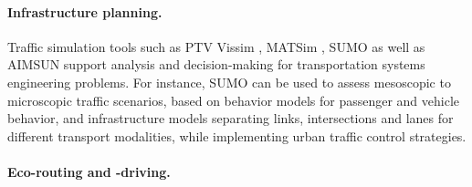 \documentclass[a4paper,twoside]{article}
\begin{document}
%	
%
%	

	\paragraph{Infrastructure planning.}
\label{sec:infrastructure-planning}
	
	
	Traffic simulation tools such as PTV Vissim \cite{fellendorf_vissim_1994}, MATSim \cite{w_axhausen_multi-agent_2016}, SUMO \cite{lopez_microscopic_2018} as well as AIMSUN \cite{barcelo2005dynamic} support analysis and decision-making for transportation systems engineering problems. %
	For instance, SUMO can be used to assess mesoscopic to microscopic traffic scenarios, based on behavior models for passenger and vehicle behavior, and infrastructure models separating links, intersections and lanes for different transport modalities, while implementing urban traffic control strategies.
	

	\paragraph{Eco-routing and -driving.}
\label{sec:eco-routing}
\end{document}
